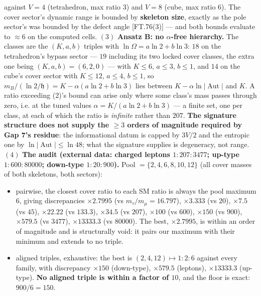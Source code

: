 \begin{theorem}
against $V=4$ (tetrahedron, max ratio $3$) and $V=8$ (cube, max ratio $6$). The cover sector's dynamic range is bounded by \textbf{skeleton size}, exactly as the pole sector's was bounded by the defect angle [FT.76(3)] — and both bounds evaluate to $\approx6$ on the computed cells. $(3)$ \textbf{Ansatz B: no $\alpha$-free hierarchy.} The classes are the $(K,a,b)$ triples with $\ln\Omega=a\ln2+b\ln3$: $18$ on the tetrahedron's bypass sector — $19$ including its two locked cover classes, the extra one being $(K,a,b)=(6,2,0)$ — with $K\le6$, $a\le3$, $b\le1$, and $14$ on the cube's cover sector with $K\le12$, $a\le4$, $b\le1$, so $m_B/\!(\ln2/\mathfrak h)=K-\alpha(a\ln2+b\ln3)$ lies between $K-\alpha\ln|\operatorname{Aut}|$ and $K$. A ratio exceeding (2)'s bound can arise only where some class's mass passes through zero, i.e. at the tuned values $\alpha=K/(a\ln2+b\ln3)$ — a finite set, one per class, at each of which the ratio is \textit{infinite} rather than $207$. \textbf{The signature structure does not supply the $\ge3$ orders of magnitude required by Gap 7's residue}: the informational datum is capped by $3V/2$ and the entropic one by $\ln|\operatorname{Aut}|\le\ln48$; what the signature supplies is degeneracy, not range. $(4)$ \textbf{The audit (external data: charged leptons $1{:}207{:}3477$; up-type $1{:}600{:}80000$; down-type $1{:}20{:}900$).} Pool $=\{2,4,6,8,10,12\}$ (all cover masses of both skeletons, both sectors):

\begin{itemize}
\item pairwise, the closest cover ratio to each SM ratio is always the pool maximum $6$, giving discrepancies $\times2.7995$ (vs $m_\tau/m_\mu=16.797$), $\times3.333$ (vs $20$), $\times7.5$ (vs $45$), $\times22.22$ (vs $133.3$), $\times34.5$ (vs $207$), $\times100$ (vs $600$), $\times150$ (vs $900$), $\times579.5$ (vs $3477$), $\times13333.3$ (vs $80000$). The best, $\times2.7995$, is within an order of magnitude and is structurally void: it pairs our maximum with their minimum and extends to no triple.
\item aligned triples, exhaustive: the best is $(2,4,12)\mapsto1{:}2{:}6$ against every family, with discrepancy $\times150$ (down-type), $\times579.5$ (leptons), $\times13333.3$ (up-type). \textbf{No aligned triple is within a factor of $10$}, and the floor is exact: $900/6=150$.
\end{itemize}


\end{theorem}
